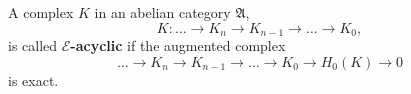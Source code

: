 A complex $K$ in an abelian category $\mathfrak{A}$,
$$K: \dots \rightarrow K_n \rightarrow K_{n-1} \rightarrow \dots \rightarrow K_0,$$
is called \textbf{$\mathcal{E}$-acyclic} if the augmented complex
$$\dots \rightarrow K_n \rightarrow K_{n-1} \rightarrow \dots \rightarrow K_0 \rightarrow H_0(K) \rightarrow 0$$
is exact.
